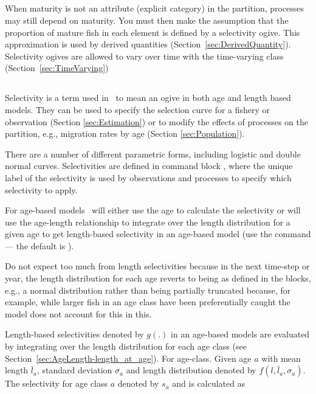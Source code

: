 \subsection{\label{sec:maturity-notinpartition}}

When maturity is not an attribute (explicit category) in the partition, processes may still depend on maturity. You must then make the assumption that the proportion of mature fish in each element is defined by a selectivity ogive. This approximation is used by derived quantities (Section~\ref{sec:DerivedQuantity}). Selectivity ogives are allowed to vary over time with the time-varying class (Section~\ref{sec:TimeVarying})

\subsection{\label{sec:Selectivity}}

Selectivity is a term used in \CNAME\ to mean an ogive in both age and length based models. They can be used to specify the selection curve for a fishery or observation  (Section \ref{sec:Estimation}) or to modify the effects of processes on the partition, e.g., migration rates by age (Section \ref{sec:Population}). 

There are a number of different parametric forms, including logistic and double normal curves. Selectivities are defined in command block , where the unique label of the selectivity is used by observations and processes to specify which selectivity to apply.

\ifAgeBased
For age-based models \CNAME\ will either use the age to calculate the selectivity or will use the age-length relationship to integrate over the length distribution for a given age to get length-based selectivity in an age-based model (use the command  --- the default is ). 

Do not expect too much from length selectivities because in the next time-step or year, the length distribution for each age reverts to being as defined in the  blocks, e.g., a normal distribution rather than being partially truncated because, for example, while larger fish in an age class have been preferentially caught the model does not account for this in this.

Length-based selectivities denoted by \(g(.)\) in an age-based models are evaluated by integrating over the length distribution for each age class (see Section~\ref{sec:AgeLength-length_at_age}). For age-class. Given age \(a\) with mean length \(\bar{l}_a\), standard deviation \(\sigma_a\) and length distribution denoted by \(f(l,\bar{l}_a, \sigma_a)\). The selectivity for age class \(a\) denoted by \(s_a\) and is calculated as

